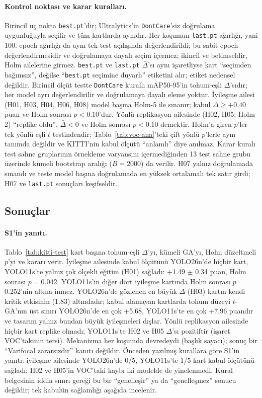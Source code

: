 \documentclass[pdflatex,iicol,sn-mathphys-num]{sn-jnl}
\begin{document}
\paragraph{Kontrol noktası ve karar kuralları.}
Birincil uç nokta \texttt{best.pt}'dir; Ultralytics'in \texttt{DontCare}'siz doğrulama uygunluğuyla seçilir ve tüm kartlarda aynıdır. Her koşumun \texttt{last.pt} ağırlığı, yani 100. epoch ağırlığı da aynı tek test açılışında değerlendirildi; bu sabit epoch değerlendirmesidir ve doğrulamaya dayalı seçim içermez; ikincil ve betimseldir, Holm ailelerine girmez. \texttt{best.pt} ve \texttt{last.pt} $\bar\Delta$'sı aynı işaretliyse kart ``seçimden bağımsız'', değilse ``\texttt{best.pt} seçimine duyarlı'' etiketini alır; etiket nedensel değildir. Birincil ölçüt testte \texttt{DontCare} kurallı mAP50-95'in tohum-eşli $\Delta$'sıdır; her model ayrı değerlendirilir ve doğrulamaya dayalı eleme yoktur. İyileşme ailesi (H01, H03, H04, H06, H08) model başına Holm-5 ile sınanır; kabul $\Delta\ge+0.40$ puan ve Holm sonrası $p<0.10$'dur. Yönlü replikasyon ailesinde (H02, H05; Holm-2) ``replike oldu'', $\bar\Delta<0$ ve Holm sonrası $p<0.10$ demektir. Holm'a giren $p$'ler tek yönlü eşli $t$ testindendir; Tablo~\ref{tab:voc-ana}'teki çift yönlü $p$'lerle aynı tanımda değildir ve KITTI'nin kabul ölçütü ``anlamlı'' diye anılmaz. Karar kuralı test sahne gruplarının örnekleme varyansını içermediğinden 13 test sahne grubu üzerinde kümeli bootstrap aralığı ($B=2000$) da verilir. H07 yalnız doğrulamada sınandı ve teste model başına doğrulamada en yüksek ortalamalı tek satır girdi; H07 ve \texttt{last.pt} sonuçları keşifseldir.

\subsection{Sonuçlar}\label{sec:genelleme-sonuc}



\paragraph{S1'in yanıtı.}
Tablo~\ref{tab:kitti-test} kart başına tohum-eşli $\Delta$'yı, kümeli GA'yı, Holm düzeltmeli $p$'yi ve kararı verir. İyileşme ailesinde kabul ölçütünü YOLO26n'de hiçbir kart, YOLO11s'te yalnız çok ölçekli eğitim (H01) sağladı: +1.49 $\pm$ 0.34 puan, Holm sonrası $p=0.042$. YOLO11s'in diğer dört iyileşme kartında Holm sonrası $p$ 0.252'nin altına inmez. YOLO26n'de gözlenen en büyük $\Delta$ (H03) kartın kendi kritik etkisinin (1.83) altındadır; kabul alamayan kartlarda tohum düzeyi $t$-GA'nın üst sınırı YOLO26n'de en çok +5.68, YOLO11s'te en çok +7.96 puandır ve tasarım yalnız bundan büyük iyileşmeleri dışlar. Yönlü replikasyon ailesinde hiçbir kart replike olmadı; YOLO11s'te H02 ve H05 $\Delta$'sı pozitiftir (işaret VOC'takinin tersi). Mekanizma her koşumda devredeydi (başlık sayacı); sonuç bir ``Varifocal zararsızdır'' kanıtı değildir. Önceden yazılmış kurallara göre S1'in yanıtı: iyileşme ailesinde YOLO26n'de 0/5, YOLO11s'te 1/5 kart kabul ölçütünü sağladı; H02 ve H05'in VOC'taki kaybı iki modelde de yinelenmedi. Kural belgesinin iddia sınırı gereği bu bir ``genelleşir'' ya da ``genelleşmez'' sonucu değildir; tek kabulün sağlamlığı aşağıda incelenir.
\end{document}
